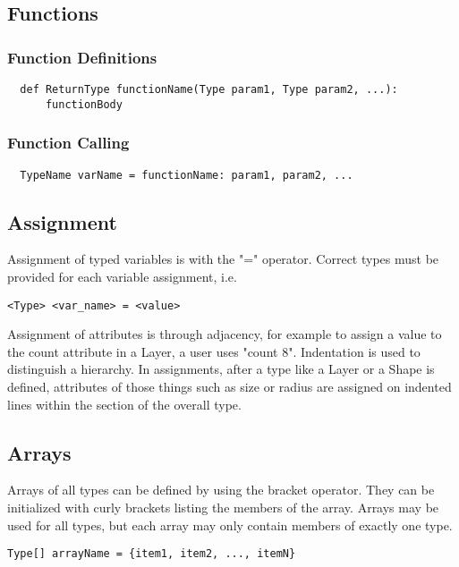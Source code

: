 \documentclass[12pt]{report}
\begin{document}
    
	\subsection*{Functions}
    
    	\subsubsection*{Function Definitions}
\begin{verbatim}       
  def ReturnType functionName(Type param1, Type param2, ...):
      functionBody
\end{verbatim}
        
        \subsubsection*{Function Calling}
\begin{verbatim}       
  TypeName varName = functionName: param1, param2, ...
\end{verbatim}
	
    \subsection*{Assignment}
 
Assignment of typed variables is with the "=" operator. Correct types must be provided for each variable assignment, i.e. \begin{verbatim}<Type> <var_name> = <value>\end{verbatim}
Assignment of attributes is through adjacency, for example to assign a value to the count attribute in a Layer, a user uses "count 8".
Indentation is used to distinguish a hierarchy. In assignments, after a type like a Layer or a Shape is defined, attributes of those things such as size or radius are assigned on indented lines within the section of the overall type.
	
    \subsection*{Arrays}
    
    Arrays of all types can be defined by using the bracket operator. They can be initialized with curly brackets listing the members of the array. Arrays may be used for all types, but each array may only contain members of exactly one type.
    
    \begin{verbatim}
Type[] arrayName = {item1, item2, ..., itemN}
\end{verbatim}
\end{document}
